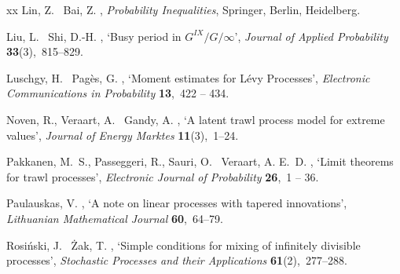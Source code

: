 \documentclass{article}
\theoremstyle{plain}
\theoremstyle{definition}
\theoremstyle{remark}
\begin{document}
\begin{thebibliography}{xx}
Lin, Z. \harvardand\ Bai, Z.  \harvardyearright , {\em Probability Inequalities}, Springer, Berlin, Heidelberg.
\newline{}

Liu, L. \harvardand\ Shi, D.-H.  \harvardyearright , `Busy period in {$G^{IX}/G/\infty$}', {\em Journal of Applied Probability} {\bf 33}(3),~815--829.
\newline{}

Luschgy, H. \harvardand\ Pag\`es, G.  \harvardyearright , `{Moment estimates for L\'evy Processes}', {\em Electronic Communications in Probability} {\bf 13},~422 -- 434.
\newline{}

Noven, R., Veraart, A. \harvardand\ Gandy, A.  \harvardyearright , `A latent trawl process model for extreme values', {\em Journal of Energy Marktes} {\bf 11}(3),~1--24.
\newline{}

Pakkanen, M.~S., Passeggeri, R., Sauri, O. \harvardand\ Veraart, A. E.~D.  \harvardyearright , `{Limit theorems for trawl processes}', {\em Electronic Journal of Probability} {\bf 26},~1 -- 36.
\newline{}

Paulauskas, V.  \harvardyearright , `A note on linear processes with tapered innovations', {\em Lithuanian Mathematical Journal} {\bf 60},~64--79.
\newline{}

Rosiński, J. \harvardand\ Żak, T.  \harvardyearright , `Simple conditions for mixing of infinitely divisible processes', {\em Stochastic Processes and their Applications} {\bf 61}(2),~277--288.
\newline{}


\end{thebibliography}
\end{document}
